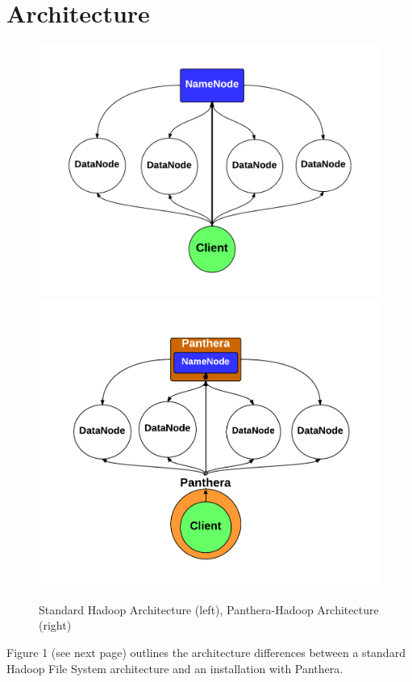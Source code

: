 \documentclass[12pt]{article}
\begin{document}
\section{Architecture}
\begin{figure}[!h]
  \caption{Standard Hadoop Architecture (left), Panthera-Hadoop Architecture (right)}
  \centering
	\includegraphics[scale=0.4]{assets/hadoop_architecture.pdf}
	\includegraphics[scale=0.4]{assets/panthera_architecture.pdf}
\end{figure}

Figure 1 (see next page) outlines the architecture differences between a standard Hadoop File System architecture and an installation with Panthera. 
\end{document}

